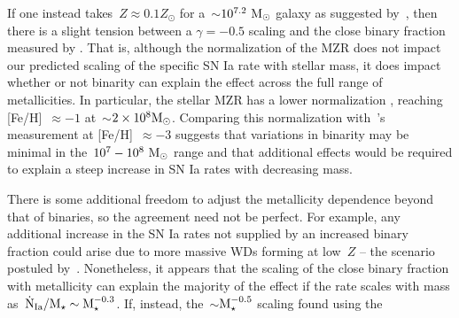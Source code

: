 \documentclass[foo.tex]{subfiles}
\begin{document}
If one instead takes~$Z \approx 0.1Z_\odot$ for a~$\sim$$10^{7.2}~\text{M}_\odot$ galaxy
as suggested by~\citet{Andrews2013}, then there is a slight tension between a
$\gamma = -0.5$ scaling and the close binary fraction measured by
\citet{Moe2019}.
{\color{red}
That is, although the normalization of the MZR does not impact our predicted
scaling of the specific SN Ia rate with stellar mass, it does impact whether or
not binarity can explain the effect across the full range of metallicities.
In particular, the stellar MZR has a lower normalization
\citep[e.g.,][]{Gallazzi2005, Kirby2013, Simon2019}, reaching [Fe/H]~$\approx
-1$ at~$\sim$$2\times10^8 \text{M}_\odot$.
Comparing this normalization with~\citeauthor{Moe2019}'s~\citeyearpar{Moe2019}
measurement at [Fe/H]~$\approx -3$ suggests that variations in binarity may be
minimal in the~$10^7 - 10^8~\text{M}_\odot$ range and that additional effects would be
required to explain a steep increase in SN Ia rates with decreasing mass.
}
\par
There is some additional freedom to adjust the metallicity dependence beyond
that of binaries, so the agreement need not be perfect.
For example, any additional increase in the SN Ia rates not supplied by an
increased binary fraction could arise due to more massive WDs forming at
low~$Z$ -- the scenario postuled by~\citet{Kistler2013}.
Nonetheless, it appears that the scaling of the close binary fraction with
metallicity can explain the majority of the effect if the rate scales with mass
as~$\dot{\text{N}}_\text{Ia} / \text{M}_\star \sim \text{M}_\star^{-0.3}$.
If, instead, the~$\sim$$\text{M}_\star^{-0.5}$ scaling found using the~\citet{Bell2003}
\end{document}
